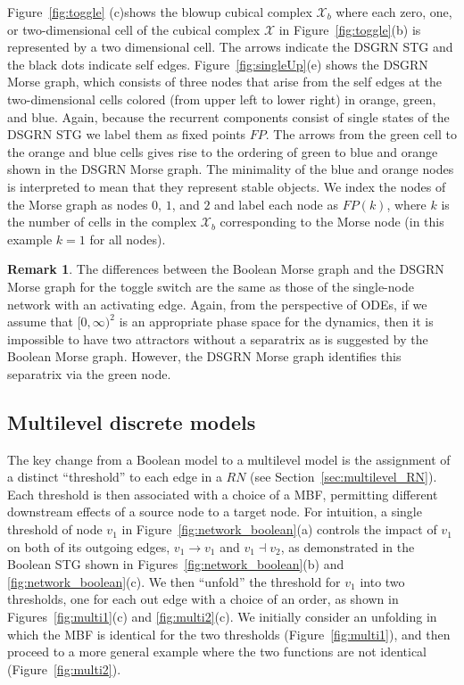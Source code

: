 \documentclass[12pt, notitlepage]{amsart}
\newcommand{\cX}{{\mathcal X}}
\theoremstyle{definition}
\newtheorem{rem}[thm]{Remark}
\begin{document}
Figure~\ref{fig:toggle} (c)shows the blowup cubical complex $\cX_b$ where each zero, one, or two-dimensional cell of the cubical complex $\cX$ in Figure~\ref{fig:toggle}(b)  is represented by a two dimensional cell. The arrows indicate the DSGRN STG and the black dots indicate self edges. Figure~\ref{fig:singleUp}(e) shows the DSGRN Morse graph, which consists of three nodes that arise from the self edges at the two-dimensional cells colored (from upper left to lower right) in orange, green, and blue. Again, because the recurrent components consist of single states of the DSGRN STG we label them as fixed points $FP$. The arrows from the green cell to the orange and blue cells gives rise to the ordering of green to blue and orange shown in the DSGRN Morse graph. The minimality of the blue and orange nodes is interpreted to mean that they represent stable objects. We index the nodes of the Morse graph as nodes $0$, $1$, and $2$ and label each node as $FP(k)$, where $k$ is the number of cells in the complex $\cX_b$ corresponding to the Morse node (in this example $k = 1$ for all nodes).

\begin{rem}
  The  differences between the Boolean Morse graph and the DSGRN Morse graph for the toggle switch are the same as those of the single-node network with an activating edge. Again, from the perspective of ODEs, if we assume that $[0,\infty)^2$ is an appropriate phase space for the dynamics, then it is impossible to have two attractors without a separatrix as is suggested by the Boolean Morse graph. However, the DSGRN Morse graph identifies this separatrix via the green node.
\end{rem}

\subsection{Multilevel discrete models}
\label{sec:multilevel_models}

The key change from a Boolean model to a multilevel model is the assignment of a distinct ``threshold'' to each edge in a $RN$ (see Section~\ref{sec:multilevel_RN}). Each threshold is then associated with a choice of a MBF, permitting different downstream effects of a source node to a target node. For intuition, a single threshold of node $v_1$ in Figure~\ref{fig:network_boolean}(a) controls the impact of $v_1$ on both of its outgoing edges, $v_1 \to v_1$ and $v_1 \dashv v_2$, as demonstrated in the Boolean STG shown in Figures~\ref{fig:network_boolean}(b) and \ref{fig:network_boolean}(c). We then ``unfold'' the threshold for $v_1$ into two thresholds, one for each out edge with a choice of an order, as shown in Figures~\ref{fig:multi1}(c) and \ref{fig:multi2}(c). We initially consider an unfolding in which the MBF is identical for the two thresholds (Figure~\ref{fig:multi1}), and then proceed to a more general example where the two functions are not identical (Figure~\ref{fig:multi2}).
\end{document}
